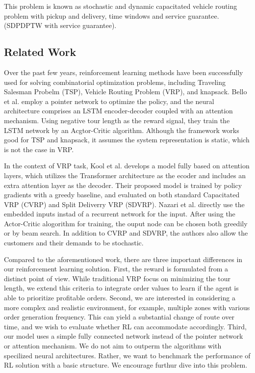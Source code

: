 \documentclass{article}
\begin{document}
This problem is known as stochastic and dynamic capacitated vehicle routing problem with pickup and delivery, time windows and service guarantee. (SDPDPTW with service guarantee).

\subsection{Related Work}
Over the past few years, reinforcement learning methods have been successfully used for solving combinatorial optimization problems, including Traveling Salesman Probelm (TSP), Vehicle Routing Problem (VRP), and knapsack. Bello et al. \cite{bello2016neural} employ a pointer network \cite{vinyals2015pointer} to optimize the policy, and the neural architecture comprises an LSTM encoder-decoder coupled with an attention mechanism. Using negative tour length as the reward signal, they train the LSTM network by an Acgtor-Critic algorithm. Although the framework works good for TSP and knapsack, it assumes the system representation is static, which is not the case in VRP. 


In the context of VRP task, Kool et al. \cite{kool2018attention} develops a model fully based on attention layers, which utilizes the Transformer architecture \cite{vaswani2017attention} as the ecoder and includes an extra attention layer as the decoder. Their proposed model is trained by policy gradients with a greedy baseline, and evaluated on both standard Capacitated VRP (CVRP) and Split Deliverry VRP (SDVRP).  Nazari et al. \cite{nazari2018reinforcement} directly use the embedded inputs instad of a recurrent network for the input. After using the Actor-Critic alogorithm for training, the ouput node can be chosen both greedily or by beam search. In addition to CVRP and SDVRP, the authors also allow the customers and their demands to be stochastic.

Compared to the aforementioned work, there are three important differences in our reinforcement learning solution. First, the reward is formulated from a distinct point of view. While traditional VRP focus on minimizing the tour length, we extend this criteria to integrate order values to learn if the agent is able to prioritize profitable orders. Second, we are interested in considering a more complex and realistic environment, for example, multiple zones with various order generation frequency. This can yield a substantial change of route over time, and we wish to evaluate whether RL can accommodate accordingly. Third, our model uses a simple fully connected network instead of the pointer network or attention mechanism. We do not aim to outperm the algorithms with specilized neural architectures. Rather, we want to benchmark the performance of RL solution with a basic structure. We encourage furthur dive into this problem.
\end{document}
